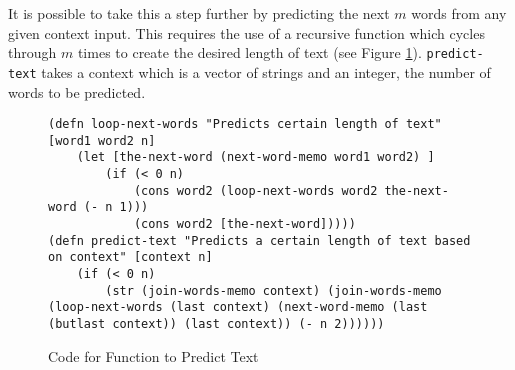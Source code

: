 


It is possible to take this a step further by predicting the next $m$ words from any given context input. This requires the use of a recursive function which cycles through $m$ times to create the desired length of text (see Figure \ref{fig:predictTextCode}). \lstinline!predict-text! takes a context which is a vector of strings and an integer, the number of words to be predicted. 

\begin{figure}[h]
\centering
\singlespacing
\begin{lstlisting}
(defn loop-next-words "Predicts certain length of text" [word1 word2 n] 
	(let [the-next-word (next-word-memo word1 word2) ]
		(if (< 0 n)  
			(cons word2 (loop-next-words word2 the-next-word (- n 1))) 
			(cons word2 [the-next-word])))) 
(defn predict-text "Predicts a certain length of text based on context" [context n] 
	(if (< 0 n) 
		(str (join-words-memo context) (join-words-memo (loop-next-words (last context) (next-word-memo (last (butlast context)) (last context)) (- n 2)))))) 
\end{lstlisting}
\doublespacing
\caption{Code for Function to Predict Text}
\label{fig:predictTextCode}
\end{figure}

%
%


